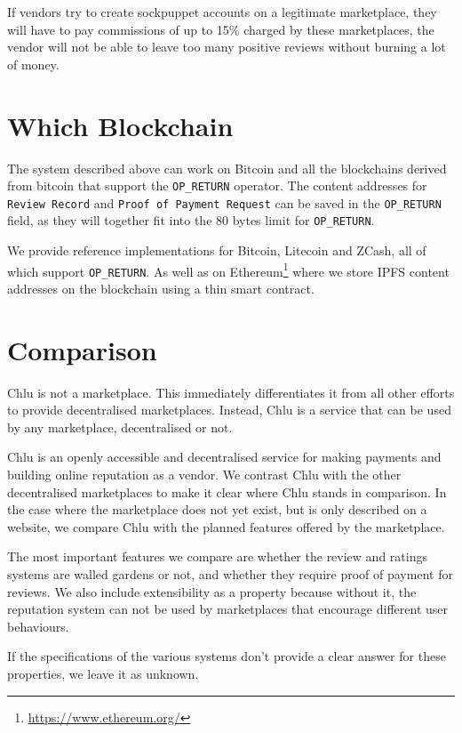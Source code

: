 \documentclass[a4paper]{article}
\begin{document}
If vendors try to create sockpuppet accounts on a legitimate
marketplace, they will have to pay commissions of up to 15\% charged
by these marketplaces, the vendor will not be able to leave too many
positive reviews without burning a lot of money.

\section{Which Blockchain}

The system described above can work on Bitcoin and all the blockchains
derived from bitcoin that support the \texttt{OP\_RETURN}
operator. The content addresses for \texttt{Review Record} and
\texttt{Proof of Payment Request} can be saved in the
\texttt{OP\_RETURN} field, as they will together fit into the 80 bytes
limit for \texttt{OP\_RETURN}.

We provide reference implementations for Bitcoin, Litecoin and ZCash,
all of which support \texttt{OP\_RETURN}. As well as on
Ethereum\footnote{\url{https://www.ethereum.org/}} where we store IPFS
content addresses on the blockchain using a thin smart contract.

\section{Comparison}

Chlu is not a marketplace. This immediately differentiates it from all
other efforts to provide decentralised marketplaces. Instead, Chlu is
a service that can be used by any marketplace, decentralised or not.

Chlu is an openly accessible and decentralised service for making
payments and building online reputation as a vendor. We contrast Chlu
with the other decentralised marketplaces to make it clear where Chlu
stands in comparison. In the case where the marketplace does not yet
exist, but is only described on a website, we compare Chlu with the
planned features offered by the marketplace.

The most important features we compare are whether the review and
ratings systems are walled gardens or not, and whether they require
proof of payment for reviews. We also include extensibility as a
property because without it, the reputation system can not be used by
marketplaces that encourage different user behaviours.

If the specifications of the various systems don't provide a clear
answer for these properties, we leave it as unknown.
\end{document}
